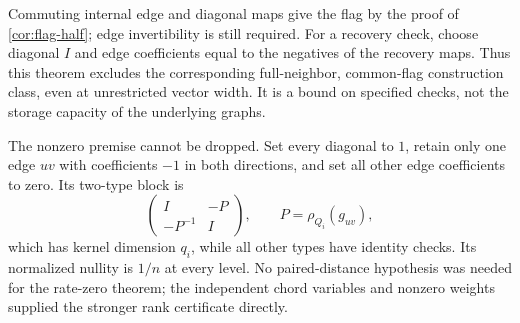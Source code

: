 Commuting internal edge and diagonal maps give the flag by the proof
of \cref{cor:flag-half}; edge invertibility is still required.
For a recovery check, choose diagonal $I$ and edge coefficients
equal to the negatives of the recovery maps. Thus this theorem
excludes the corresponding full-neighbor, common-flag construction
class, even at unrestricted vector width. It is a bound on specified
checks, not the storage capacity of the underlying graphs.

The nonzero premise cannot be dropped. Set every diagonal to $1$,
retain only one edge $uv$ with coefficients $-1$ in both directions,
and set all other edge coefficients to zero. Its two-type block is
\[
 \begin{pmatrix}I&-P\\-P^{-1}&I\end{pmatrix},
 \qquad P=\rho_{Q_i}(g_{uv}),
\]
which has kernel dimension $q_i$, while all other types have identity
checks. Its normalized nullity is $1/n$ at every level.
No paired-distance hypothesis was needed for the rate-zero theorem;
the independent chord variables and nonzero weights supplied the
stronger rank certificate directly.
